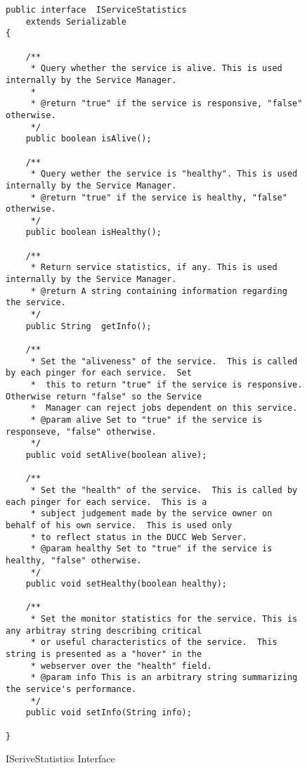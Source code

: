       \begin{figure}[H]
\begin{verbatim}
public interface  IServiceStatistics
    extends Serializable
{

    /**
     * Query whether the service is alive. This is used internally by the Service Manager.
     *
     * @return "true" if the service is responsive, "false" otherwise.
     */
    public boolean isAlive();

    /**
     * Query wether the service is "healthy". This is used internally by the Service Manager.
     * @return "true" if the service is healthy, "false" otherwise.
     */
    public boolean isHealthy();

    /**
     * Return service statistics, if any. This is used internally by the Service Manager.
     * @return A string containing information regarding the service. 
     */
    public String  getInfo();

    /**
     * Set the "aliveness" of the service.  This is called by each pinger for each service.  Set
     *  this to return "true" if the service is responsive.  Otherwise return "false" so the Service
     *  Manager can reject jobs dependent on this service.
     * @param alive Set to "true" if the service is responseve, "false" otherwise.
     */
    public void setAlive(boolean alive);
 
    /**
     * Set the "health" of the service.  This is called by each pinger for each service.  This is a
     * subject judgement made by the service owner on behalf of his own service.  This is used only
     * to reflect status in the DUCC Web Server.
     * @param healthy Set to "true" if the service is healthy, "false" otherwise.
     */
    public void setHealthy(boolean healthy);

    /**
     * Set the monitor statistics for the service. This is any arbitray string describing critical
     * or useful characteristics of the service.  This string is presented as a "hover" in the
     * webserver over the "health" field.
     * @param info This is an arbitrary string summarizing the service's performance. 
     */
    public void setInfo(String info);

}
\end{verbatim}
        \caption{ISeriveStatistics Interface}
        \label{fig:service.iservicestatistics}

      \end{figure}

